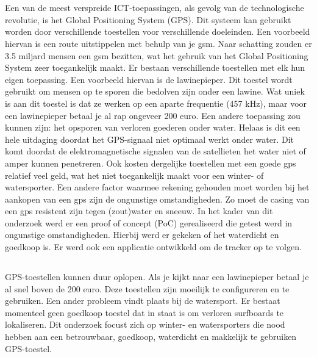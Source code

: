 
\chapter{}
\label{ch:inleiding}
Een van de meest verspreide ICT-toepassingen, als gevolg van de technologische revolutie, is het Global Positioning System (GPS). Dit systeem kan gebruikt worden door verschillende toestellen voor verschillende doeleinden. Een voorbeeld hiervan is een route uitstippelen met behulp van je gsm. Naar schatting zouden er 3.5 miljard mensen een gsm bezitten, wat het gebruik van het Global Positioning System zeer toegankelijk maakt. \autocite{numberOfSmartphones} Er bestaan verschillende toestellen met elk hun eigen toepassing. Een voorbeeld hiervan is de lawinepieper. Dit toestel wordt gebruikt om mensen op te sporen die bedolven zijn onder een lawine. Wat uniek is aan dit toestel is dat ze werken op een aparte frequentie (457 kHz), maar voor een lawinepieper betaal je al rap ongeveer 200 euro. \cite{avalancheTransceivers}
Een andere toepassing zou kunnen zijn: het opsporen van verloren goederen onder water. Helaas is dit een hele uitdaging doordat
het GPS-signaal niet optimaal werkt onder water. \autocite{underwaterProblem} Dit komt doordat de elektromagnetische signalen van de satellieten het water niet of amper kunnen penetreren. Ook kosten dergelijke toestellen met een goede gps relatief veel geld, wat het niet toegankelijk maakt voor een winter- of watersporter. 
Een andere factor waarmee rekening gehouden moet worden bij het aankopen van een gps zijn de ongunstige omstandigheden. Zo moet de casing van een gps resistent zijn tegen (zout)water en sneeuw.
In het kader van dit onderzoek werd er een proof of concept (PoC) gerealiseerd die getest werd in ongunstige omstandigheden. Hierbij werd er gekeken of het waterdicht en goedkoop is. Er werd ook een applicatie ontwikkeld om de tracker op te volgen.


\section{}
\label{sec:probleemstelling}

GPS-toestellen kunnen duur oplopen. Als je kijkt naar een lawinepieper betaal je al snel boven de 200 euro. Deze toestellen zijn moeilijk te configureren en te gebruiken. Een ander probleem vindt plaats bij de watersport. Er bestaat momenteel geen goedkoop toestel dat in staat is om verloren surfboards te lokaliseren. Dit onderzoek focust zich op winter- en watersporters die nood hebben aan een betrouwbaar, goedkoop, waterdicht en makkelijk te gebruiken GPS-toestel.

